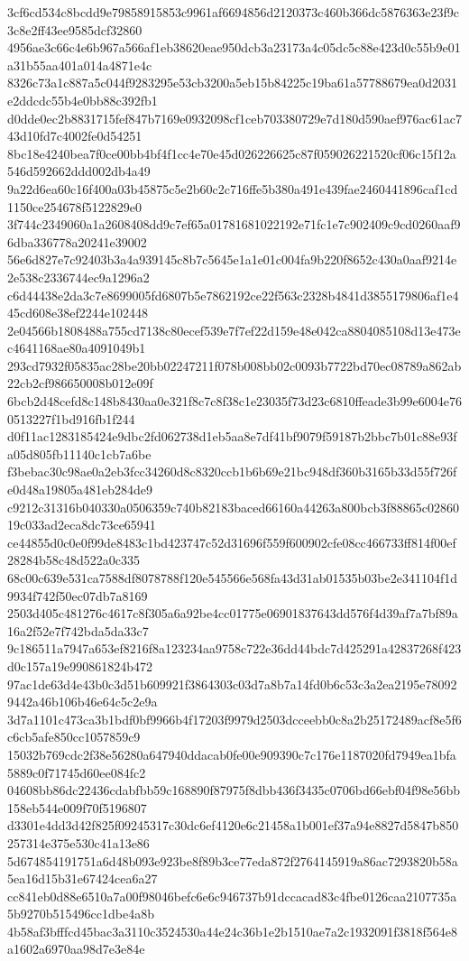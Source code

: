 {3cf6cd534c8bcdd9e79858915853c9961af6694856d2120373c460b366dc5876363e23f9c3c8e2ff43ee9585dcf32860
4956ae3c66c4e6b967a566af1eb38620eae950dcb3a23173a4c05dc5c88e423d0c55b9e01a31b55aa401a014a4871e4c
8326c73a1c887a5c044f9283295e53cb3200a5eb15b84225c19ba61a57788679ea0d2031e2ddcdc55b4e0bb88c392fb1
d0dde0ec2b8831715fef847b7169e0932098cf1ceb703380729e7d180d590aef976ac61ac743d10fd7c4002fe0d54251
8bc18e4240bea7f0ce00bb4bf4f1cc4e70e45d026226625c87f059026221520cf06c15f12a546d592662ddd002db4a49
9a22d6ea60c16f400a03b45875c5e2b60c2c716ffe5b380a491e439fae2460441896caf1cd1150ce254678f5122829e0
3f744c2349060a1a2608408dd9c7ef65a01781681022192e71fc1e7c902409c9cd0260aaf96dba336778a20241e39002
56e6d827e7c92403b3a4a939145c8b7c5645e1a1e01c004fa9b220f8652c430a0aaf9214e2e538c2336744ec9a1296a2
c6d44438e2da3c7e8699005fd6807b5e7862192ce22f563c2328b4841d3855179806af1e445cd608e38ef2244e102448
2e04566b1808488a755cd7138c80ecef539e7f7ef22d159e48e042ca8804085108d13e473ec4641168ae80a4091049b1
293cd7932f05835ac28be20bb02247211f078b008bb02c0093b7722bd70ec08789a862ab22cb2cf986650008b012e09f
6bcb2d48cefd8c148b8430aa0e321f8c7c8f38c1e23035f73d23c6810ffeade3b99e6004e760513227f1bd916fb1f244
d0f11ac1283185424e9dbc2fd062738d1eb5aa8e7df41bf9079f59187b2bbc7b01c88e93fa05d805fb11140c1cb7a6be
f3bebac30c98ae0a2eb3fcc34260d8c8320ccb1b6b69e21bc948df360b3165b33d55f726fe0d48a19805a481eb284de9
c9212c31316b040330a0506359c740b82183baced66160a44263a800bcb3f88865c0286019c033ad2eca8dc73ce65941
ce44855d0c0e0f99de8483c1bd423747c52d31696f559f600902cfe08cc466733ff814f00ef28284b58c48d522a0c335
68c00c639e531ca7588df8078788f120e545566e568fa43d31ab01535b03be2e341104f1d9934f742f50ec07db7a8169
2503d405c481276c4617c8f305a6a92be4cc01775e06901837643dd576f4d39af7a7bf89a16a2f52e7f742bda5da33c7
9c186511a7947a653ef8216f8a123234aa9758c722e36dd44bdc7d425291a42837268f423d0c157a19e990861824b472
97ac1de63d4e43b0c3d51b609921f3864303c03d7a8b7a14fd0b6c53c3a2ea2195e780929442a46b106b46e64c5c2e9a
3d7a1101c473ca3b1bdf0bf9966b4f17203f9979d2503dcceebb0c8a2b25172489acf8e5f6c6cb5afe850cc1057859c9
15032b769cdc2f38e56280a647940ddacab0fe00e909390c7c176e1187020fd7949ea1bfa5889c0f71745d60ee084fc2
04608bb86dc22436cdabfbb59c168890f87975f8dbb436f3435c0706bd66ebf04f98e56bb158eb544e009f70f5196807
d3301e4dd3d42f825f09245317c30dc6ef4120e6c21458a1b001ef37a94e8827d5847b850257314e375e530c41a13e86
5d674854191751a6d48b093e923be8f89b3ce77eda872f2764145919a86ac7293820b58a5ea16d15b31e67424cea6a27
cc841eb0d88e6510a7a00f98046befc6e6c946737b91dccacad83c4fbe0126caa2107735a5b9270b515496cc1dbe4a8b
4b58af3bfffcd45bac3a3110c3524530a44e24c36b1e2b1510ae7a2c1932091f3818f564e8a1602a6970aa98d7e3e84e
}

